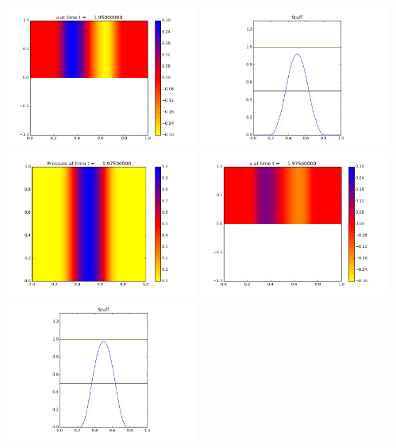 \documentclass[11pt]{article}
\begin{document}
\includegraphics[width=0.475\textwidth]{frame0078fig1.png}
\vskip 10pt 
\includegraphics[width=0.475\textwidth]{frame0078fig3.png}
\vskip 10pt 
\includegraphics[width=0.475\textwidth]{frame0079fig0.png}
\includegraphics[width=0.475\textwidth]{frame0079fig1.png}
\vskip 10pt 
\includegraphics[width=0.475\textwidth]{frame0079fig3.png}
\end{document}
